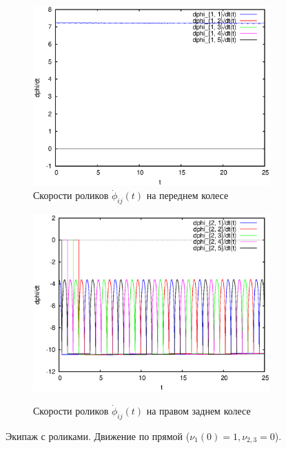 \begin{figure}[H]
    \begin{subfigure}[t]{0.45\textwidth}
        \centering
        \includegraphics[width=\linewidth]{pic/rol__straight__velocities_of_rollers_of_wheel_1}
        \caption{Скорости роликов $\dot{\phi}_{ij}(t)$ на переднем колесе}
        \label{fig:rol__straight__velocities_of_rollers_of_wheel_1}    
    \end{subfigure}
    \hfill
    \begin{subfigure}[t]{0.45\textwidth}
        \centering
        \includegraphics[width=\linewidth]{pic/rol__straight__velocities_of_rollers_of_wheel_2} \\
        \caption{Скорости роликов $\dot{\phi}_{ij}(t)$ на правом заднем колесе}
        \label{fig:rol__straight__velocities_of_rollers_of_wheel_2}
    \end{subfigure}
    \hfill
    
    \caption{Экипаж с роликами. Движение по прямой ($\nu_1(0) = 1, \nu_{2,3} = 0$).}
    \label{fig:straight}
    
\end{figure}
